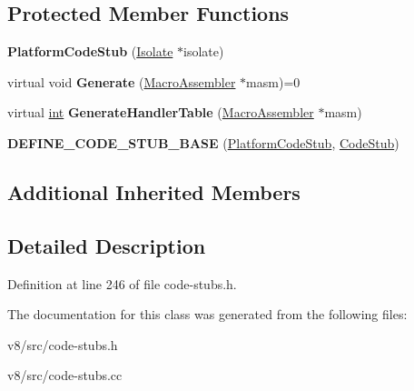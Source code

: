\subsection*{Protected Member Functions}
\begin{DoxyCompactItemize}
\item 
\mbox{\label{classv8_1_1internal_1_1PlatformCodeStub_ab8e03282c98f4fc5087b2137e36da433}} 
{\bfseries Platform\+Code\+Stub} (\mbox{\hyperlink{classv8_1_1internal_1_1Isolate}{Isolate}} $\ast$isolate)
\item 
\mbox{\label{classv8_1_1internal_1_1PlatformCodeStub_abf3ab13ab21a602c4126a8085f1122b0}} 
virtual void {\bfseries Generate} (\mbox{\hyperlink{classv8_1_1internal_1_1MacroAssembler}{Macro\+Assembler}} $\ast$masm)=0
\item 
\mbox{\label{classv8_1_1internal_1_1PlatformCodeStub_adbd166d89fc3aa22b15d5a144969e745}} 
virtual \mbox{\hyperlink{classint}{int}} {\bfseries Generate\+Handler\+Table} (\mbox{\hyperlink{classv8_1_1internal_1_1MacroAssembler}{Macro\+Assembler}} $\ast$masm)
\item 
\mbox{\label{classv8_1_1internal_1_1PlatformCodeStub_a1472e6a39b9412d4bca69250355e9522}} 
{\bfseries D\+E\+F\+I\+N\+E\+\_\+\+C\+O\+D\+E\+\_\+\+S\+T\+U\+B\+\_\+\+B\+A\+SE} (\mbox{\hyperlink{classv8_1_1internal_1_1PlatformCodeStub}{Platform\+Code\+Stub}}, \mbox{\hyperlink{classv8_1_1internal_1_1CodeStub}{Code\+Stub}})
\end{DoxyCompactItemize}
\subsection*{Additional Inherited Members}


\subsection{Detailed Description}


Definition at line 246 of file code-\/stubs.\+h.



The documentation for this class was generated from the following files\+:\begin{DoxyCompactItemize}
\item 
v8/src/code-\/stubs.\+h\item 
v8/src/code-\/stubs.\+cc\end{DoxyCompactItemize}
